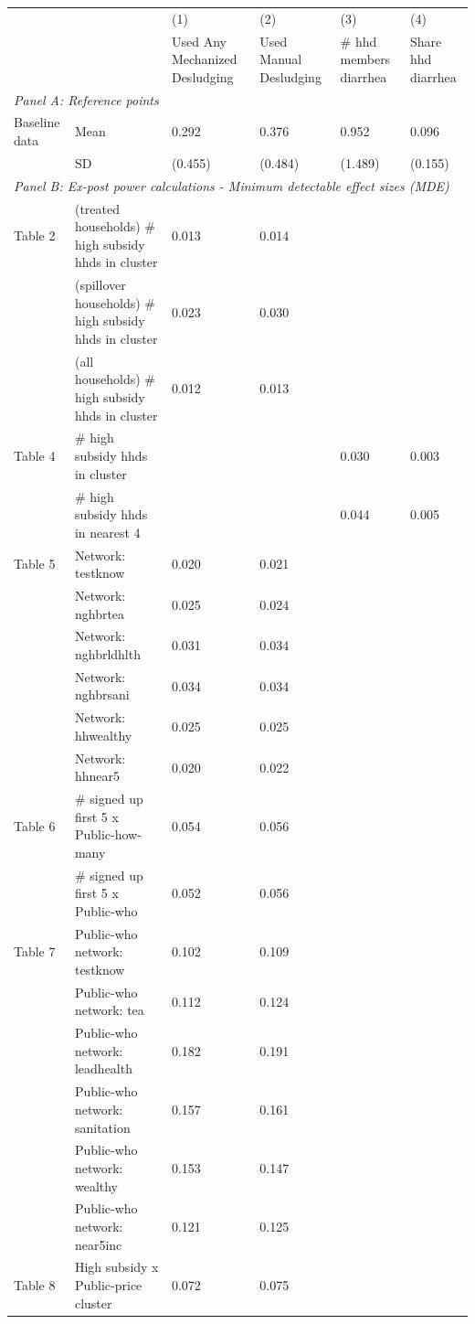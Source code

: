 \begin{tabular}{llllll}
\hline\hline
 & & (1) & (2) & (3) & (4) \\
 & & Used Any Mechanized Desludging & Used Manual Desludging & # hhd members diarrhea & Share hhd diarrhea \\
\hline
\multicolumn{6}{l}{\textit{Panel A: Reference points}} \\
Baseline data & Mean & 0.292 & 0.376 & 0.952 & 0.096 \\
 & SD & (0.455) & (0.484) & (1.489) & (0.155) \\
\hline
\multicolumn{6}{l}{\textit{Panel B: Ex-post power calculations - Minimum detectable effect sizes (MDE)}} \\
Table 2 & (treated households) # high subsidy hhds in cluster & 0.013 & 0.014 &  &  \\
 & (spillover households) # high subsidy hhds in cluster & 0.023 & 0.030 &  &  \\
 & (all households) # high subsidy hhds in cluster & 0.012 & 0.013 &  &  \\
Table 4 & # high subsidy hhds in cluster &  &  & 0.030 & 0.003 \\
 & # high subsidy hhds in nearest 4 &  &  & 0.044 & 0.005 \\
Table 5 & Network: testknow & 0.020 & 0.021 &  &  \\
 & Network: nghbrtea & 0.025 & 0.024 &  &  \\
 & Network: nghbrldhlth & 0.031 & 0.034 &  &  \\
 & Network: nghbrsani & 0.034 & 0.034 &  &  \\
 & Network: hhwealthy & 0.025 & 0.025 &  &  \\
 & Network: hhnear5 & 0.020 & 0.022 &  &  \\
Table 6 & # signed up first 5 x Public-how-many & 0.054 & 0.056 &  &  \\
 & # signed up first 5 x Public-who & 0.052 & 0.056 &  &  \\
Table 7 & Public-who network: testknow & 0.102 & 0.109 &  &  \\
 & Public-who network: tea & 0.112 & 0.124 &  &  \\
 & Public-who network: leadhealth & 0.182 & 0.191 &  &  \\
 & Public-who network: sanitation & 0.157 & 0.161 &  &  \\
 & Public-who network: wealthy & 0.153 & 0.147 &  &  \\
 & Public-who network: near5inc & 0.121 & 0.125 &  &  \\
Table 8 & High subsidy x Public-price cluster & 0.072 & 0.075 &  &  \\
\hline\hline
\end{tabular}

